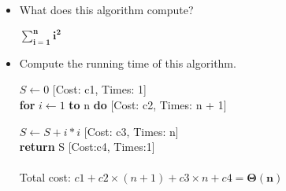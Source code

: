 \documentclass[[11pts]{report}
\begin{document}
\begin{enumerate}
\begin{itemize}
\item What does this algorithm compute?
\begin{center}
$\mathbf{\sum_{i=1}^ni^2}$
\end{center}
\item Compute the running time of this algorithm.

$S \gets 0$        [Cost: c1, Times: 1] \\
\textbf{for} $i \gets 1$ \textbf{to} n \textbf{do} [Cost: c2, Times: n + 1]
\par \quad $S \gets S + i*i$ [Cost: c3, Times: n] \\
\textbf{return} S [Cost:c4, Times:1]
\\ \\ Total cost: $c1 + c2 \times (n+1) + c3 \times n + c4 = \mathbf{\Theta(n)} $
\end{itemize}

\end{enumerate}
\end{document}
